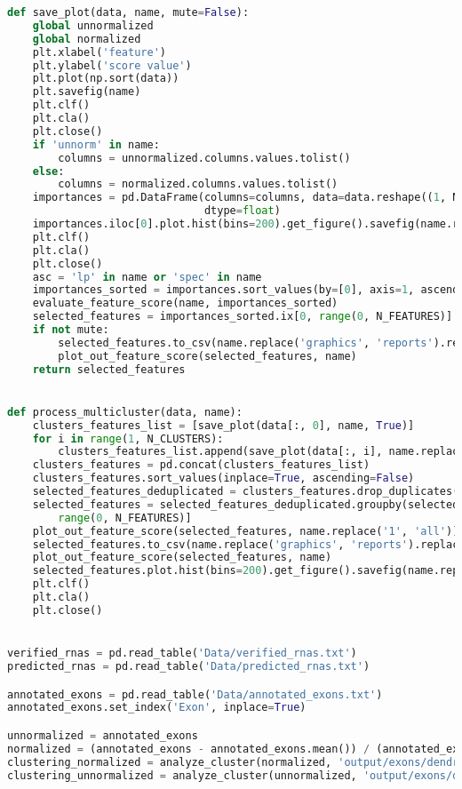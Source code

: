 \begin{lstlisting}[columns=fullflexible,language=Python]
def save_plot(data, name, mute=False):
    global unnormalized
    global normalized
    plt.xlabel('feature')
    plt.ylabel('score value')
    plt.plot(np.sort(data))
    plt.savefig(name)
    plt.clf()
    plt.cla()
    plt.close()
    if 'unnorm' in name:
        columns = unnormalized.columns.values.tolist()
    else:
        columns = normalized.columns.values.tolist()
    importances = pd.DataFrame(columns=columns, data=data.reshape((1, N_ALL_FEATURES)),
                               dtype=float)
    importances.iloc[0].plot.hist(bins=200).get_figure().savefig(name.replace('graphics', 'histograms'))
    plt.clf()
    plt.cla()
    plt.close()
    asc = 'lp' in name or 'spec' in name
    importances_sorted = importances.sort_values(by=[0], axis=1, ascending=asc)
    evaluate_feature_score(name, importances_sorted)
    selected_features = importances_sorted.ix[0, range(0, N_FEATURES)]
    if not mute:
        selected_features.to_csv(name.replace('graphics', 'reports').replace('png', 'csv'))
        plot_out_feature_score(selected_features, name)
    return selected_features


def process_multicluster(data, name):
    clusters_features_list = [save_plot(data[:, 0], name, True)]
    for i in range(1, N_CLUSTERS):
        clusters_features_list.append(save_plot(data[:, i], name.replace('1', str(i + 1)), True))
    clusters_features = pd.concat(clusters_features_list)
    clusters_features.sort_values(inplace=True, ascending=False)
    selected_features_deduplicated = clusters_features.drop_duplicates()
    selected_features = selected_features_deduplicated.groupby(selected_features_deduplicated.index).first()[
        range(0, N_FEATURES)]
    plot_out_feature_score(selected_features, name.replace('1', 'all'))
    selected_features.to_csv(name.replace('graphics', 'reports').replace('1c','all').replace('png', 'csv'))
    plot_out_feature_score(selected_features, name)
    selected_features.plot.hist(bins=200).get_figure().savefig(name.replace('graphics', 'histograms').replace('1c', 'all'))
    plt.clf()
    plt.cla()
    plt.close()


verified_rnas = pd.read_table('Data/verified_rnas.txt')
predicted_rnas = pd.read_table('Data/predicted_rnas.txt')

annotated_exons = pd.read_table('Data/annotated_exons.txt')
annotated_exons.set_index('Exon', inplace=True)

unnormalized = annotated_exons
normalized = (annotated_exons - annotated_exons.mean()) / (annotated_exons.max() - annotated_exons.min())
clustering_normalized = analyze_cluster(normalized, 'output/exons/dendrograms/original_normalized.png')
clustering_unnormalized = analyze_cluster(unnormalized, 'output/exons/dendrograms/original_unnormalized.png')


\end{lstlisting}
